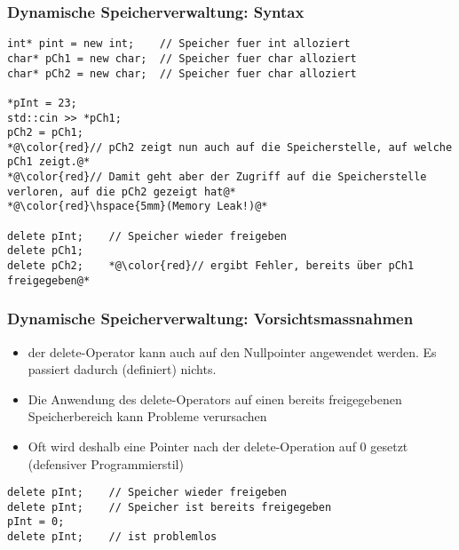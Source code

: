 \subsubsection{Dynamische Speicherverwaltung: Syntax\hfill}
\label{sec:unterunterabschnitt}
\noindent
\begin{minipage}{\linewidth}
\begin{lstlisting}
int* pint = new int;	// Speicher fuer int alloziert
char* pCh1 = new char;	// Speicher fuer char alloziert
char* pCh2 = new char;	// Speicher fuer char alloziert

*pInt = 23;
std::cin >> *pCh1;
pCh2 = pCh1;
*@\color{red}// pCh2 zeigt nun auch auf die Speicherstelle, auf welche pCh1 zeigt.@*
*@\color{red}// Damit geht aber der Zugriff auf die Speicherstelle verloren, auf die pCh2 gezeigt hat@*
*@\color{red}\hspace{5mm}(Memory Leak!)@*

delete pInt;	// Speicher wieder freigeben
delete pCh1;
delete pCh2;	*@\color{red}// ergibt Fehler, bereits über pCh1 freigegeben@*
\end{lstlisting}
\end{minipage}

\subsubsection{Dynamische Speicherverwaltung: Vorsichtsmassnahmen\hfill}
\label{sec:unterunterabschnitt}
\begin{itemize}
	\item der delete-Operator kann auch auf den Nullpointer angewendet werden. Es passiert dadurch (definiert) nichts.
	\item Die Anwendung des delete-Operators auf einen  bereits freigegebenen Speicherbereich kann Probleme verursachen
	\item Oft wird deshalb eine Pointer nach der delete-Operation auf 0 gesetzt (defensiver Programmierstil)
\end{itemize}
\noindent
\begin{minipage}{\linewidth}
\begin{lstlisting}
delete pInt;	// Speicher wieder freigeben
delete pInt;	// Speicher ist bereits freigegeben
pInt = 0;
delete pInt;	// ist problemlos
\end{lstlisting}
\end{minipage}

